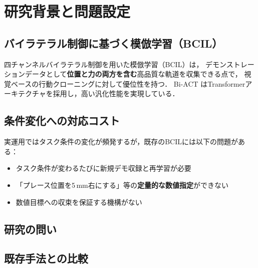 \section{研究背景と問題設定}

\subsection{バイラテラル制御に基づく模倣学習（BCIL）}

四チャンネルバイラテラル制御を用いた模倣学習（BCIL）は，
デモンストレーションデータとして\textbf{位置と力の両方を含む}高品質な軌道を収集できる点で，
視覚ベースの行動クローニングに対して優位性を持つ．
Bi-ACT \cite{Buamanee2024} はTransformerアーキテクチャを採用し，高い汎化性能を実現している．

\subsection{条件変化への対応コスト}

実運用ではタスク条件の変化が頻発するが，既存のBCILには以下の問題がある：
\begin{itemize}
  \item タスク条件が変わるたびに新規デモ収録と再学習が必要
  \item 「プレース位置を5\,mm右にする」等の\textbf{定量的な数値指定}ができない
  \item 数値目標への収束を保証する機構がない
\end{itemize}

\subsection{研究の問い}

\begin{center}
  \fboxsep=5pt
\end{center}

\subsection{既存手法との比較}

